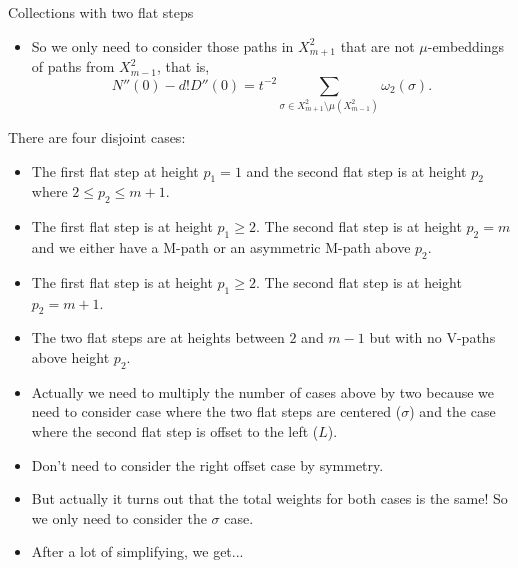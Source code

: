 \documentclass[12pt]{beamer}
\begin{document}
\begin{frame}[allowframebreaks]{Collections with two flat steps}
\framebreak

\begin{itemize}
\item So we only need to consider those paths in $X_{m+1}^2$ that are not $\mu$-embeddings of paths from $X_{m-1}^2$, that is,
\begin{equation*}
N''(0)-d!D''(0) = t^{-2}\sum\limits_{\sigma\in X_{m+1}^2\setminus\mu(X_{m-1}^2)}\omega_2(\sigma).
\end{equation*}
\end{itemize}

\framebreak

There are four disjoint cases:
\begin{itemize}
\item The first flat step at height $p_1=1$ and the second flat step is at height $p_2$ where $2\leq p_2\leq m+1$.
\item The first flat step is at height $p_1 \geq 2$. The second flat step is at height $p_2 = m$ and we either have a M-path or an asymmetric M-path above $p_2$.
\item The first flat step is at height $p_1 \geq 2$. The second flat step is at height $p_2 = m+1$.
\item The two flat steps are at heights between $2$ and $m-1$ but with no V-paths above height $p_2$.
\end{itemize}

\framebreak

\begin{itemize}
\item Actually we need to multiply the number of cases above by two because we need to consider case where the two flat steps are centered ($\sigma$) and the case where the second flat step is offset to the left ($L$).
\item Don't need to consider the right offset case by symmetry.
\item But actually it turns out that the total weights for both cases is the same! So we only need to consider the $\sigma$ case.
\item After a lot of simplifying, we get...
\end{itemize}

\end{frame}
\end{document}
